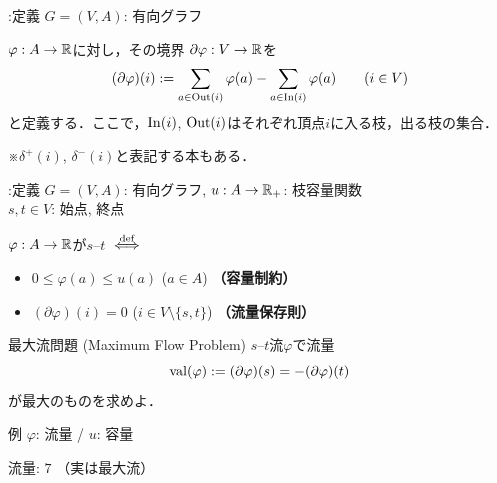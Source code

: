 \documentclass[14pt,aspectratio=169,xcolor=dvipsnames,table,onlytextwidth,dvipdfmx]{beamer}
\begin{document}
\begin{frame}{\insertsection :定義}
    $G = (V, A)$: 有向グラフ 

    \begin{definition}
        $\varphi: A \to \mathbb{R}$に対し，その\alert{境界} $\partial \varphi: V \to \mathbb{R}$を
        \[
            (\partial\varphi)(i) := \sum_{a \in \operatorname{Out}(i)} \varphi(a) - \sum_{a \in \operatorname{In}(i)} \varphi(a)  \qquad (i \in V)
        \]
        と定義する．ここで，$\operatorname{In}(i)$, $\operatorname{Out}(i)$はそれぞれ頂点$i$に入る枝，出る枝の集合．

        {\hfill\footnotesize ※$\delta^+(i)$, $\delta^-(i)$と表記する本もある．}
    \end{definition}
\end{frame}

\begin{frame}{\insertsection :定義}
    $G = (V, A)$: 有向グラフ, $u: A \to \mathbb{R}_+$: 枝容量関数 \\
    $s, t \in V$: 始点, 終点 

    \begin{definition}[$s$--$t$流]
        $\varphi: A \to \mathbb{R}$が\alert{$s$--$t$} $\overset{\text{def}}{\iff}$
        \begin{itemize}
            \item $0 \leq \varphi(a) \leq u(a)$ \qquad ($a \in A$) \hfill \textbf{（容量制約）} 
            \item $(\partial\varphi)(i) = 0$ \qquad ($i \in V \setminus \{s, t\}$) \hfill \textbf{（流量保存則）}
        \end{itemize}
    \end{definition}

    \pause
    \begin{block}{最大流問題 (Maximum Flow Problem)}
        $s$--$t$流$\varphi$で\alert{流量} \[
            \operatorname{val}(\varphi) := (\partial\varphi)(s) = -(\partial\varphi)(t) 
        \]
        が最大のものを求めよ．
    \end{block}
\end{frame}

\begin{frame}[label=flow-example]{例}
    \textcolor{UniBlue}{$\varphi$}: 流量 / $u$: 容量

    \begin{center}
    \end{center}

    流量: $7$ （実は最大流）
\end{frame}
\end{document}
